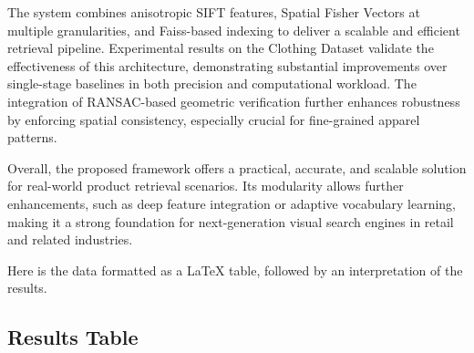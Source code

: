 \documentclass[conference]{IEEEtran}
\begin{document}
The system combines anisotropic SIFT features, Spatial Fisher Vectors at multiple granularities, and Faiss-based indexing to deliver a scalable and efficient retrieval pipeline. Experimental results on the Clothing Dataset validate the effectiveness of this architecture, demonstrating substantial improvements over single-stage baselines in both precision and computational workload. The integration of RANSAC-based geometric verification further enhances robustness by enforcing spatial consistency, especially crucial for fine-grained apparel patterns.

Overall, the proposed framework offers a practical, accurate, and scalable solution for real-world product retrieval scenarios. Its modularity allows further enhancements, such as deep feature integration or adaptive vocabulary learning, making it a strong foundation for next-generation visual search engines in retail and related industries.



Here is the data formatted as a LaTeX table, followed by an interpretation of the results.



\subsection*{Results Table}
\end{document}

